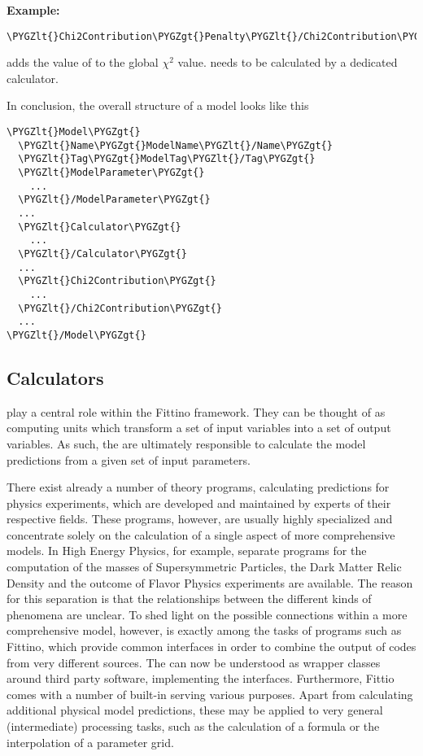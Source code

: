 \documentclass[letterpaper,10pt,english]{sphinxmanual}
\def\PYGZlt{\char`\<}
\def\PYGZgt{\char`\>}
\begin{document}
\textbf{Example:}

\begin{Verbatim}[commandchars=\\\{\}]
\PYGZlt{}Chi2Contribution\PYGZgt{}Penalty\PYGZlt{}/Chi2Contribution\PYGZgt{}
\end{Verbatim}

adds the value of  to the global \(\chi^2\) value.  needs to be calculated
by a dedicated calculator.

In conclusion, the overall structure of a model looks like this

\begin{Verbatim}[commandchars=\\\{\}]
\PYGZlt{}Model\PYGZgt{}
  \PYGZlt{}Name\PYGZgt{}ModelName\PYGZlt{}/Name\PYGZgt{}
  \PYGZlt{}Tag\PYGZgt{}ModelTag\PYGZlt{}/Tag\PYGZgt{}
  \PYGZlt{}ModelParameter\PYGZgt{}
    ...
  \PYGZlt{}/ModelParameter\PYGZgt{}
  ...
  \PYGZlt{}Calculator\PYGZgt{}
    ...
  \PYGZlt{}/Calculator\PYGZgt{}
  ...
  \PYGZlt{}Chi2Contribution\PYGZgt{}
    ...
  \PYGZlt{}/Chi2Contribution\PYGZgt{}
  ...
\PYGZlt{}/Model\PYGZgt{}
\end{Verbatim}


\subsection{Calculators}
\label{calculators:calculators}\label{calculators::doc}\label{calculators:id1}
 play a central role within the Fittino framework. They can be thought of as
computing units which transform a set of input variables into a set of output variables. As such,
the  are ultimately responsible to calculate the model predictions from a given set
of input parameters.

There exist already a number of theory programs, calculating predictions for physics experiments,
which are developed and maintained by experts of their respective fields. These programs, however,
are usually highly specialized and concentrate solely on the calculation of a single aspect of more
comprehensive models. In High Energy Physics, for example, separate programs for the computation of
the masses of Supersymmetric Particles, the Dark Matter Relic Density and the outcome of Flavor
Physics experiments are available. The reason for this separation is that the relationships between
the different kinds of phenomena are unclear. To shed light on the possible connections within a
more comprehensive model, however, is exactly among the tasks of programs such as Fittino, which
provide common interfaces in order to combine the output of codes from very different sources. The
 can now be understood as wrapper classes around third party software, implementing
the interfaces. Furthermore, Fittio comes with a number of built-in  serving various
purposes. Apart from calculating additional physical model predictions, these  may
be applied to very general (intermediate) processing tasks, such as the calculation of a formula or
the interpolation of a parameter grid.
\end{document}
